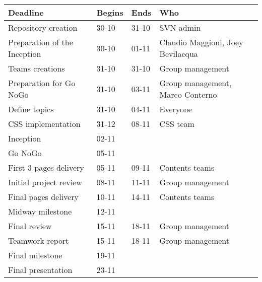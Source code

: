 \documentclass[hidelinks,12pt,a4paper,numbers=enddot]{scrartcl}
\begin{document}
\begin{table}[h]
\begin{tabular}{l l l l}

\textbf{Deadline} & \textbf{Begins} & \textbf{Ends} & \textbf{Who}\\\hline

Repository creation & 30-10 & 31-10 & SVN admin\\
Preparation of the Inception & 30-10 & 01-11 & Claudio Maggioni, Joey Bevilacqua\\ 
Teams creations & 31-10 & 31-10 & Group management\\
Preparation for Go NoGo & 31-10 & 03-11 & Group management, Marco Conterno\\
Define topics & 31-10 & 04-11 & Everyone\\
CSS implementation & 31-12 & 08-11 & CSS team\\
Inception & 02-11 & & \\
Go NoGo & 05-11 & & \\
First 3 pages delivery & 05-11 & 09-11 & Contents teams\\
Initial project review & 08-11 & 11-11 & Group management\\
Final pages delivery & 10-11 & 14-11 & Contents teams\\
Midway milestone & 12-11 & & \\
Final review & 15-11 & 18-11 & Group management\\
Teamwork report & 15-11 & 18-11 & Group management\\
Final milestone & 19-11 & & \\
Final presentation & 23-11 & &

\end{tabular}
\end{table}
\end{document}
